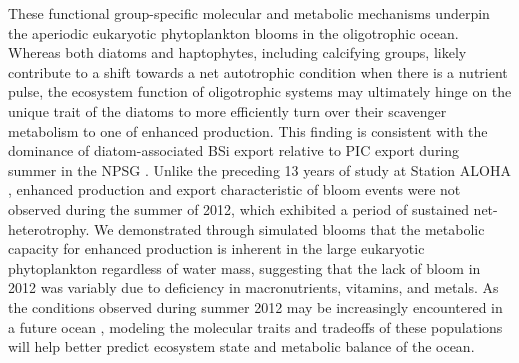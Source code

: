 These functional group-specific molecular and metabolic mechanisms underpin the aperiodic eukaryotic phytoplankton blooms in the oligotrophic ocean. Whereas both diatoms and haptophytes, including calcifying groups, likely contribute to a shift towards a net autotrophic condition when there is a nutrient pulse, the ecosystem function of oligotrophic systems may ultimately hinge on the unique trait of the diatoms to more efficiently turn over their scavenger metabolism to one of enhanced production. This finding is consistent with the dominance of diatom-associated BSi export relative to PIC export during summer in the NPSG \citep{Karl2012}. Unlike the preceding 13 years of study at Station ALOHA \citep{Karl2012}, enhanced production and export characteristic of bloom events were not observed during the summer of 2012, which exhibited a period of sustained net-heterotrophy. We demonstrated through simulated blooms that the metabolic capacity for enhanced production is inherent in the large eukaryotic phytoplankton regardless of water mass, suggesting that the lack of bloom in 2012 was variably due to deficiency in macronutrients, vitamins, and metals. As the conditions observed during summer 2012 may be increasingly encountered in a future ocean \citep{Doney2012}, modeling the molecular traits and tradeoffs of these populations will help better predict ecosystem state and metabolic balance of the ocean. \par

